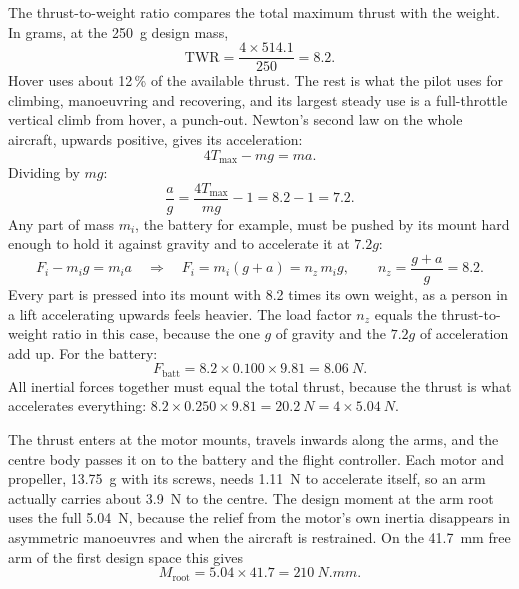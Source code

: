 The thrust-to-weight ratio compares the total maximum thrust with the weight. In grams, at the \SI{250}{g} design mass,
\begin{equation}
\text{TWR} = \frac{4 \times 514.1}{250} = 8.2.
\end{equation}
Hover uses about 12\,\% of the available thrust. The rest is what the pilot uses for climbing, manoeuvring and recovering, and its largest steady use is a full-throttle vertical climb from hover, a punch-out. Newton's second law on the whole aircraft, upwards positive, gives its acceleration:
\begin{equation}
4T_\text{max} - mg = ma.
\end{equation}
Dividing by $mg$:
\begin{equation}
\frac{a}{g} = \frac{4T_\text{max}}{mg} - 1 = 8.2 - 1 = 7.2.
\end{equation}
Any part of mass $m_i$, the battery for example, must be pushed by its mount hard enough to hold it against gravity and to accelerate it at $7.2g$:
\begin{equation}
F_i - m_i g = m_i a \quad\Rightarrow\quad F_i = m_i(g + a) = n_z\, m_i g, \qquad n_z = \frac{g + a}{g} = 8.2.
\end{equation}
Every part is pressed into its mount with 8.2 times its own weight, as a person in a lift accelerating upwards feels heavier. The load factor $n_z$ equals the thrust-to-weight ratio in this case, because the one $g$ of gravity and the $7.2g$ of acceleration add up. For the battery:
\begin{equation}
F_\text{batt} = 8.2 \times 0.100 \times 9.81 = \SI{8.06}{N}.
\end{equation}
All inertial forces together must equal the total thrust, because the thrust is what accelerates everything: $8.2 \times 0.250 \times 9.81 = \SI{20.2}{N} = 4 \times \SI{5.04}{N}$.

The thrust enters at the motor mounts, travels inwards along the arms, and the centre body passes it on to the battery and the flight controller. Each motor and propeller, \SI{13.75}{g} with its screws, needs \SI{1.11}{N} to accelerate itself, so an arm actually carries about \SI{3.9}{N} to the centre. The design moment at the arm root uses the full \SI{5.04}{N}, because the relief from the motor's own inertia disappears in asymmetric manoeuvres and when the aircraft is restrained. On the \SI{41.7}{mm} free arm of the first design space this gives
\begin{equation}
M_\text{root} = 5.04 \times 41.7 = \SI{210}{N.mm}.
\end{equation}

